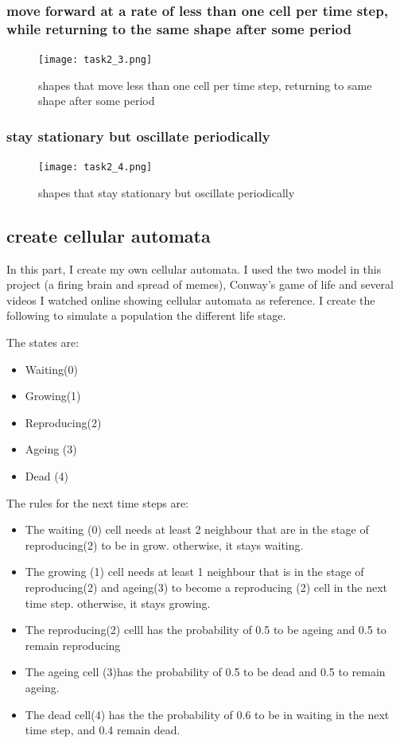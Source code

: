 \documentclass[12pt]{article}
\begin{document}
\subsubsection{move forward at a rate of less than one cell per time step, while returning to the same shape after some period}
\begin{figure}[H] %
\centering
\texttt{[image: task2\_3.png]}
\caption{shapes that move less than one cell per time step, returning to same shape after some period}
\label{fig:task2_3}
\end{figure}

\subsubsection{stay stationary but oscillate periodically}
\begin{figure}[H] %
\centering
\texttt{[image: task2\_4.png]}
\caption{shapes that stay stationary but oscillate periodically}
\label{fig:task2_4}
\end{figure}


\subsection{create cellular automata}
In this part, I create my own cellular automata. I used the two model in this project (a firing brain and spread of memes), Conway's game of life and several videos I watched online showing cellular automata as reference. I create the following to simulate a population the different life stage.\par
The states are:
\begin{itemize}  
\item Waiting(0)
\item Growing(1)
\item Reproducing(2)
\item Ageing (3)
\item Dead (4)\\
\end{itemize}

The rules for the next time steps are:
\begin{itemize}  
\item The waiting (0) cell needs at least 2 neighbour that are in the stage of reproducing(2) to be in grow. otherwise, it stays waiting.
\item The growing (1) cell needs at least 1 neighbour that is in the stage of reproducing(2) and ageing(3) to become a reproducing (2) cell in the next time step. otherwise, it stays growing.
\item The reproducing(2) celll has the probability of 0.5 to be ageing and 0.5 to remain reproducing
\item The ageing cell (3)has the probability of 0.5 to be dead and 0.5 to remain ageing.
\item The dead cell(4) has the the probability of 0.6 to be in waiting in the next time step, and 0.4 remain dead.
\end{itemize}
\end{document}
